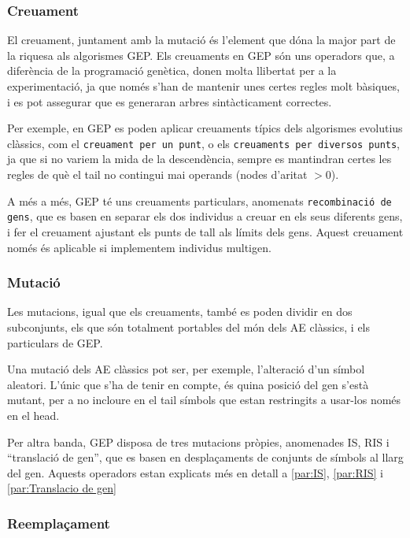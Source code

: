 
\subsubsection{Creuament} %
\label{ssub:Creuament}

El creuament, juntament amb la mutació és l'element que dóna la major part de la
riquesa als algorismes GEP.  Els creuaments en GEP són uns operadors que, a
diferència de la programació genètica, donen molta llibertat per a la
experimentació, ja que només s'han de mantenir unes certes regles molt bàsiques,
i es pot assegurar que es generaran arbres sintàcticament correctes.

Per exemple, en GEP es poden aplicar creuaments típics dels algorismes evolutius
clàssics, com el \texttt{creuament per un punt}, o els \texttt{creuaments per
diversos punts}, ja que si no variem la mida de la descendència, sempre es
mantindran certes les regles de què el tail no contingui mai operands (nodes
d'aritat $>0$).

A més a més, GEP té uns creuaments particulars, anomenats \texttt{recombinació
de gens}, que es basen en separar els dos individus a creuar en els seus
diferents gens, i fer el creuament ajustant els punts de tall als límits dels
gens.  Aquest creuament només és aplicable si implementem individus multigen.

\subsubsection{Mutació} %
\label{ssub:Mutacio}
Les mutacions, igual que els creuaments, també es poden dividir en dos
subconjunts, els que són totalment portables del món dels AE clàssics, i els
particulars de GEP.

Una mutació dels AE clàssics pot ser, per exemple, l'alteració d'un símbol
aleatori.  L'únic que s'ha de tenir en compte, és quina posició del gen s'està
mutant, per a no incloure en el tail símbols que estan restringits a usar-los
només en el head.

Per altra banda, GEP disposa de tres mutacions pròpies, anomenades IS, RIS i
``translació de gen'', que es basen en desplaçaments de conjunts de símbols al
llarg del gen.  Aquests operadors estan explicats més en detall a \ref{par:IS},
\ref{par:RIS} i \ref{par:Translacio de gen}

\subsubsection{Reemplaçament} %
\label{ssub:Reemplacament}

